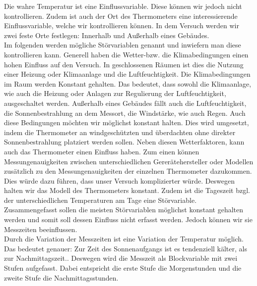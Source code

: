 \documentclass[ ngerman, fontsize= 12pt, paper=a4, headings=big, titlepage=true]{article}
\begin{document}
Die wahre Temperatur ist eine Einflussvariable. Diese können wir jedoch nicht kontrollieren.  Zudem ist auch der Ort des Thermometers eine interessierende Einflussvariable, welche wir kontrollieren können. In dem Versuch werden wir zwei feste Orte festlegen: Innerhalb und Außerhalb eines Gebäudes. \\


Im folgenden werden mögliche Störvariablen genannt und inwiefern man diese kontrollieren kann. Generell haben die Wetter-bzw. die Klimabedingungen einen hohen Einfluss auf den Versuch.  In geschlossenen Räumen ist dies die Nutzung einer Heizung oder Klimaanlage und die Luftfeuchtigkeit. Die Klimabedingungen im Raum werden Konstant gehalten. Das bedeutet, dass sowohl die Klimaanlage, wie auch die Heizung oder Anlagen zur Regulierung der Luftfeuchtigkeit, ausgeschaltet werden. Außerhalb eines Gebäudes fällt auch die Luftfeuchtigkeit, die Sonnenbestrahlung an dem Messort, die Windstärke, wie auch Regen. Auch diese Bedingungen möchten wir möglichst konstant halten. Dies wird umgesetzt, indem die Thermometer an windgeschützten und überdachten ohne direkter Sonnenbestrahlung platziert werden sollen. Neben diesen Wetterfaktoren, kann auch das Thermometer einen Einfluss haben. Zum einen können Messungenauigkeiten zwischen unterschiedlichen Gererätehersteller oder Modellen zusätzlich zu den Messungenauigkeiten der einzelnen Thermometer dazukommen. Dies würde dazu führen, dass unser Versuch komplizierter würde. Deswegen halten wir das Modell des Thermometers konstant. Zudem ist die Tageszeit bzgl. der unterschiedlichen Temperaturen am Tage eine Störvariable. \\

Zusammengefasst sollen die meisten Störvariablen möglichst konstant gehalten werden und somit soll dessen Einfluss nicht erfasst werden. Jedoch können wir sie Messzeiten beeinflussen.  \\

Durch die Variation der Messzeiten ist eine Variation der Temperatur möglich. Das bedeutet genauer: Zur Zeit des Sonnenaufgangs ist es tendenziell kälter, als zur Nachmittagszeit.\cite{WK2}. Deswegen wird die Messzeit als Blockvariable mit zwei Stufen aufgefasst. Dabei  entspricht die erste Stufe die Morgenstunden und die zweite Stufe die Nachmittagsstunden. 
\end{document}

